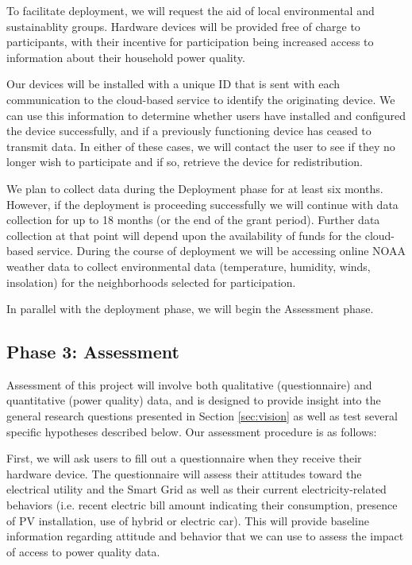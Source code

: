To facilitate deployment, we will request the aid of local environmental and sustainablity groups.  Hardware devices will be provided free of charge to participants, with their incentive for participation being increased access to information about their household power quality.  

Our devices will be installed with a unique ID that is sent with each communication to the cloud-based service to identify the originating device.  We can use this information to determine whether users have installed and configured the device successfully, and if a previously functioning device has ceased to transmit data.   In either of these cases, we will contact the user to see if they no longer wish to participate and if so, retrieve the device for redistribution. 

We plan to collect data during the Deployment phase for at least six months. However, if the deployment is proceeding successfully we will continue with data collection for up to 18 months (or the end of the grant period).  Further data collection at that point will depend upon the availability of funds for the cloud-based service.
During the course of deployment we will be accessing online NOAA weather data to collect environmental data (temperature, humidity, winds, insolation) for the neighborhoods selected for participation. 

In parallel with the deployment phase, we will begin the Assessment phase. 

\subsection{Phase 3: Assessment}

Assessment of this project will involve both qualitative (questionnaire) and quantitative (power quality) data, and is designed to provide insight into the general research questions presented in Section \ref{sec:vision} as well as test several specific hypotheses described below. Our assessment procedure is as follows:

First, we will ask users to fill out a questionnaire when they receive their hardware device.  The questionnaire will assess their attitudes toward the electrical utility and the Smart Grid as well as their current electricity-related behaviors (i.e. recent electric bill amount indicating their consumption, presence of PV installation, use of hybrid or electric car). This will provide baseline information regarding attitude and behavior that we can use to assess the impact of access to power quality data.

